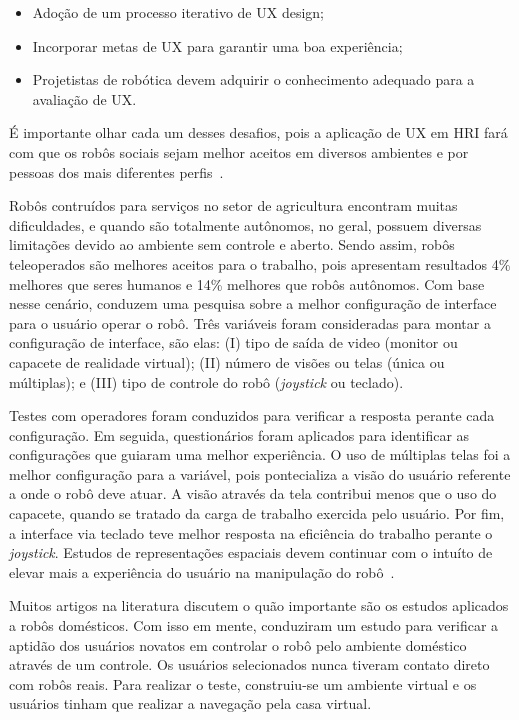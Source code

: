 \begin{itemize}
    \item Adoção de um processo iterativo de UX design;
    \item Incorporar metas de UX para garantir uma boa experiência;
    \item Projetistas de robótica devem adquirir o conhecimento adequado para a avaliação de UX.
\end{itemize}

É importante olhar cada um desses desafios, pois a aplicação de UX em HRI fará com que os robôs sociais sejam melhor aceitos em diversos ambientes e por pessoas dos mais diferentes perfis~\cite{lindblom:2016}.

Robôs contruídos para serviços no setor de agricultura encontram muitas dificuldades, e quando são totalmente autônomos, no geral, possuem diversas limitações devido ao ambiente sem controle e aberto. Sendo assim, robôs teleoperados são melhores aceitos para o trabalho, pois apresentam resultados 4\% melhores que seres humanos e 14\% melhores que robôs autônomos. Com base nesse cenário,  conduzem uma pesquisa sobre a melhor configuração de interface para o usuário operar o robô. Três variáveis foram consideradas para montar a configuração de interface, são elas: (I) tipo de saída de video (monitor ou capacete de realidade virtual); (II) número de visões ou telas (única ou múltiplas); e (III) tipo de controle do robô (\emph{joystick} ou teclado).

Testes com operadores foram conduzidos para verificar a resposta perante cada configuração. Em seguida, questionários foram aplicados para identificar as configurações que guiaram uma melhor experiência. O uso de múltiplas telas foi a melhor configuração para a variável, pois pontecializa a visão do usuário referente a onde o robô deve atuar. A visão através da tela contribui menos que o uso do capacete, quando se tratado da carga de trabalho exercida pelo usuário. Por fim, a interface via teclado teve melhor resposta na eficiência do trabalho perante o \emph{joystick}. Estudos de representações espaciais devem continuar com o intuíto de elevar mais a experiência do usuário na manipulação do robô~\cite{adamides:2017}.

Muitos artigos na literatura discutem o quão importante são os estudos aplicados a robôs domésticos. Com isso em mente,  conduziram um estudo para verificar a aptidão dos usuários novatos em controlar o robô pelo ambiente doméstico através de um controle. Os usuários selecionados nunca tiveram contato direto com robôs reais. Para realizar o teste, construiu-se um ambiente virtual e os usuários tinham que realizar a navegação pela casa virtual.

